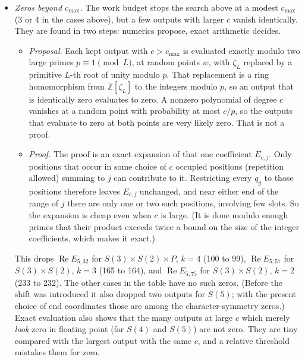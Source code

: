 \documentclass[11pt]{article}
\theoremstyle{definition}
\theoremstyle{remark}
\begin{document}
\begin{itemize}
    $S(4)$, $k=2$ goes from 613 to 612 and $S(5)$, $k = 4$ from 13082 to 13081
    ($c_{\max} = 3$).
  \item \emph{Zeros beyond $c_{\max}$.} The work budget stops the search above
    at a modest $c_{\max}$ (3 or 4 in the cases above), but a few outputs with
    larger $c$ vanish identically. They are found in two steps: numerics
    propose, exact arithmetic decides.
    \begin{itemize}
      \item \emph{Proposal.} Each kept output with $c > c_{\max}$ is evaluated
        exactly modulo two large primes $p \equiv 1 \pmod L$, at random points
        $w$, with $\zeta_L$ replaced by a primitive $L$-th root of unity modulo
        $p$. That replacement is a ring homomorphism from $\mathbb{Z}[\zeta_L]$
        to the integers modulo $p$, so an output that is identically zero
        evaluates to zero. A nonzero polynomial of degree $c$ vanishes at a
        random point with probability at most $c/p$, so the outputs that
        evaluate to zero at both points are very likely zero. That is not a
        proof.
      \item \emph{Proof.} The proof is an exact expansion of that one
        coefficient $E_{c,j}$. Only positions that occur in some choice of $c$
        occupied positions (repetition allowed) summing to $j$ can contribute
        to it. Restricting every $q_g$ to those positions therefore leaves
        $E_{c,j}$ unchanged, and near either end of the range of $j$ there are
        only one or two such positions, involving few slots. So the expansion
        is cheap even when $c$ is large. (It is done modulo enough primes that
        their product exceeds twice a bound on the size of the integer
        coefficients, which makes it exact.)
    \end{itemize}
    This drops $\operatorname{Re} E_{5,32}$ for $S(3)\times S(2)\times P$,
    $k=4$ (100 to 99), $\operatorname{Re} E_{5,57}$ for $S(3)\times S(2)$,
    $k=3$ (165 to 164), and $\operatorname{Re} E_{5,75}$ for
    $S(3)\times S(2)$, $k=2$ (233 to 232). The other cases in the table have
    no such zeros. (Before the shift was introduced it also dropped two
    outputs for $S(5)$; with the present choice of end coordinates those are
    among the character-symmetry zeros.) Exact evaluation also shows that the many outputs at large $c$ which
    merely \emph{look} zero in floating point (for $S(4)$ and $S(5)$) are not
    zero. They are tiny compared with the largest output with the same $c$, and
    a relative threshold mistakes them for zero.


\end{itemize}
\end{document}
